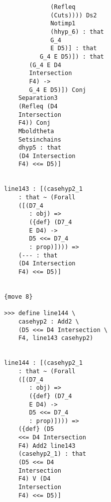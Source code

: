 \documentclass[12pt]{article}
\begin{document}
\begin{verbatim}
                                        (Refleq 
                                        (Cuts)))) Ds2 
                                        Notimp1 
                                        (hhyp_6) : that 
                                        G_4 
                                        E D5)] : that 
                                     G_4 E D5)]) : that 
                                  (G_4 E D4 
                                  Intersection 
                                  F4) -> 
                                  G_4 E D5)]) Conj 
                               Separation3 
                               (Refleq (D4 
                               Intersection 
                               F4)) Conj 
                               Mboldtheta 
                               Setsinchains 
                               dhyp5 : that 
                               (D4 Intersection 
                               F4) <<= D5)]


                           line143 : [(casehyp2_1 
                               : that ~ (Forall 
                               ([(D7_4 
                                  : obj) => 
                                  ({def} (D7_4 
                                  E D4) -> 
                                  D5 <<= D7_4 
                                  : prop)]))) => 
                               (--- : that 
                               (D4 Intersection 
                               F4) <<= D5)]


                           {move 8}

                           >>> define line144 \
                               casehyp2 : Add2 \
                               (D5 <<= D4 Intersection \
                               F4, line143 casehyp2)


                           line144 : [(casehyp2_1 
                               : that ~ (Forall 
                               ([(D7_4 
                                  : obj) => 
                                  ({def} (D7_4 
                                  E D4) -> 
                                  D5 <<= D7_4 
                                  : prop)]))) => 
                               ({def} (D5 
                               <<= D4 Intersection 
                               F4) Add2 line143 
                               (casehyp2_1) : that 
                               (D5 <<= D4 
                               Intersection 
                               F4) V (D4 
                               Intersection 
                               F4) <<= D5)]



\end{verbatim}
\end{document}
